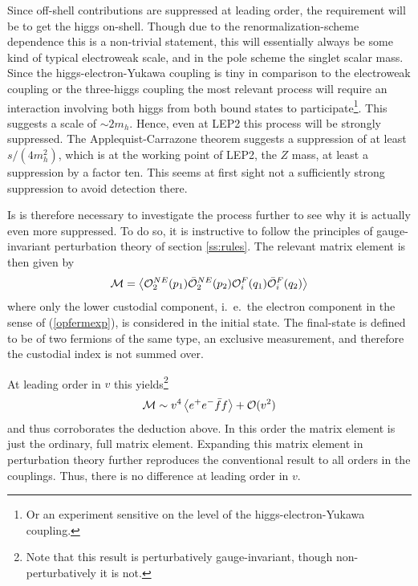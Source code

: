 \documentclass[final,twoside,12pt]{article}
\newcommand*{\no}{\noindent}
\newcommand*{\be}{\begin{equation}}
\newcommand*{\ee}{\end{equation}}
\newcommand*{\pref}[1]{(\ref{#1})}
\newcommand*{\1}{1\!\!\!\bot}
\newcommand*{\la}{\left\langle}
\newcommand*{\ra}{\right\rangle}
\newcommand*{\op}{{\cal O}}
\begin{document}
Since off-shell contributions are suppressed at leading order, the requirement will be to get the higgs on-shell. Though due to the renormalization-scheme dependence this is a non-trivial statement, this will essentially always be some kind of typical electroweak scale, and in the pole scheme the singlet scalar mass. Since the higgs-electron-Yukawa coupling is tiny in comparison to the electroweak coupling or the three-higgs coupling \cite{pdg} the most relevant process will require an interaction involving both higgs from both bound states to participate\footnote{Or an experiment sensitive on the level of the higgs-electron-Yukawa coupling.}. This suggests a scale of $\sim2m_h$. Hence, even at LEP2 this process will be strongly suppressed. The Applequist-Carrazone theorem \cite{BeiglboCk:2006lfa} suggests a suppression of at least $s/(4m_h^2)$, which is at the working point of LEP2, the $Z$ mass, at least a suppression by a factor ten. This seems at first sight not a sufficiently strong suppression to avoid detection there.

Is is therefore necessary to investigate the process further to see why it is actually even more suppressed. To do so, it is instructive to follow the principles of gauge-invariant perturbation theory of section \ref{ss:rules}. The relevant matrix element is then given by \cite{Egger:2017tkd}
\be
{\cal M}=\la {\cal O}^{NE}_2(p_1){\bar{\cal O}}^{NE}_2(p_2){\cal O}^F_i(q_1){\bar{\cal O}}^F_i(q_2)\ra\label{eeff}
\ee
\no where only the lower custodial component, i.\ e.\ the electron component in the sense of \pref{opfermexp}, is considered in the initial state. The final-state is defined to be of two fermions of the same type, an exclusive measurement, and therefore the custodial index is not summed over.

At leading order in $v$ this yields\footnote{Note that this result is perturbatively gauge-invariant, though non-perturbatively it is not.}
\be
{\cal M}\sim v^4\la e^+e^-\bar{f}f\ra+\op(v^2)\label{eeffv0}
\ee
\no and thus corroborates the deduction above. In this order the matrix element is just the ordinary, full matrix element. Expanding this matrix element in perturbation theory further reproduces the conventional result \cite{Bohm:2001yx} to all orders in the couplings. Thus, there is no difference at leading order in $v$.
\end{document}
